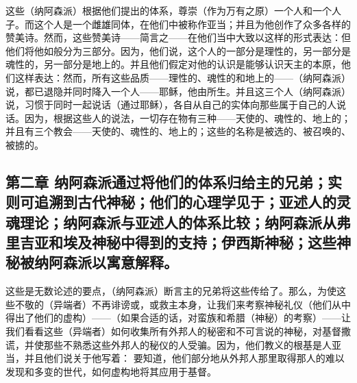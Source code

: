 这些（纳阿森派）根据他们提出的体系，尊崇（作为万有之原）一个人和一个人子。而这个人是一个雌雄同体，在他们中被称作亚当；并且为他创作了众多各样的赞美诗。然而，这些赞美诗——简言之——在他们当中大致以这样的形式表达：但他们将他如般分为三部分。因为，他们说，这个人的一部分是理性的，另一部分是魂性的，另一部分是地上的。并且他们假定对他的认识是能够认识天主的本原，他们这样表达：然而，所有这些品质——理性的、魂性的和地上的——（纳阿森派）说，都已退隐并同时降入一个人——耶稣，他由所生。并且这三个人（纳阿森派）说，习惯于同时一起说话（通过耶稣），各自从自己的实体向那些属于自己的人说话。因为，根据这些人的说法，一切存在物有三种——天使的、魂性的、地上的；并且有三个教会——天使的、魂性的、地上的；这些的名称是被选的、被召唤的、被掳的。\par


\subsection{第二章 纳阿森派通过将他们的体系归给主的兄弟；实则可追溯到古代神秘；他们的心理学见于；亚述人的灵魂理论；纳阿森派与亚述人的体系比较；纳阿森派从弗里吉亚和埃及神秘中得到的支持；伊西斯神秘；这些神秘被纳阿森派以寓意解释。}

这些是无数论述的要点，（纳阿森派）断言主的兄弟将这些传给了。那么，为使这些不敬的（异端者）不再诽谤或，或救主本身，让我们来考察神秘礼仪（他们从中得出了他们的虚构）——（如果合适的话，对蛮族和希腊（神秘）的考察）——让我们看看这些（异端者）如何收集所有外邦人的秘密和不可言说的神秘，对基督撒谎，并使那些不熟悉这些外邦人的秘仪的人受骗。因为，他们教义的根基是人亚当，并且他们说关于他写着： 要知道，他们部分地从外邦人那里取得那人的难以发现和多变的世代，如何虚构地将其应用于基督。\par

